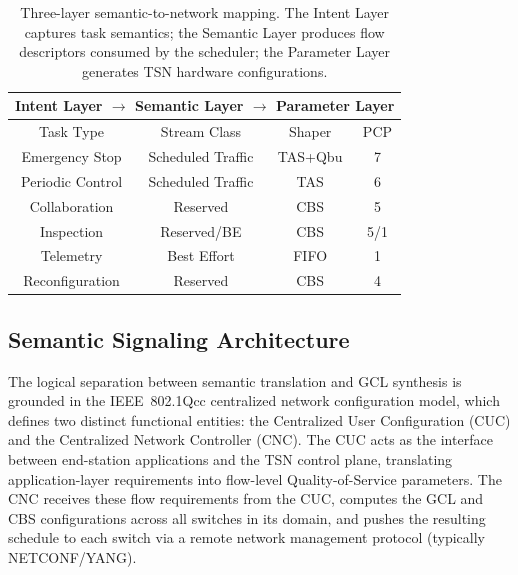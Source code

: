 \documentclass[conference]{IEEEtran}
\begin{document}
\begin{table}[t]
\centering
\begin{tabular}{|c|c|c|c|}
\hline
\multicolumn{4}{|c|}{\textbf{Intent Layer} $\rightarrow$ \textbf{Semantic Layer} $\rightarrow$ \textbf{Parameter Layer}} \\
\hline
Task Type & Stream Class & Shaper & PCP \\
\hline
Emergency Stop & Scheduled Traffic & TAS+Qbu & 7 \\
Periodic Control & Scheduled Traffic & TAS & 6 \\
Collaboration & Reserved & CBS & 5 \\
Inspection & Reserved/BE & CBS & 5/1 \\
Telemetry & Best Effort & FIFO & 1 \\
Reconfiguration & Reserved & CBS & 4 \\
\hline
\end{tabular}
\caption{Three-layer semantic-to-network mapping. The Intent Layer captures task semantics; the Semantic Layer produces flow descriptors consumed by the scheduler; the Parameter Layer generates TSN hardware configurations.}
\label{tab:arch}
\end{table}

\subsection{Semantic Signaling Architecture}

The logical separation between semantic translation and GCL synthesis is grounded in the IEEE~802.1Qcc centralized network configuration model, which defines two distinct functional entities: the Centralized User Configuration (CUC) and the Centralized Network Controller (CNC). The CUC acts as the interface between end-station applications and the TSN control plane, translating application-layer requirements into flow-level Quality-of-Service parameters. The CNC receives these flow requirements from the CUC, computes the GCL and CBS configurations across all switches in its domain, and pushes the resulting schedule to each switch via a remote network management protocol (typically NETCONF/YANG).
\end{document}
